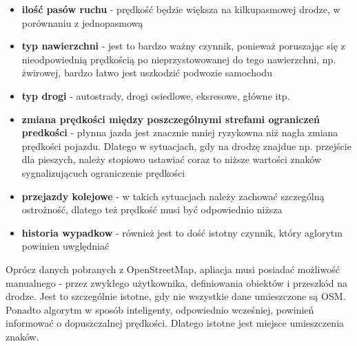 \begin{itemize}
\item \textbf{ilość pasów ruchu} - prędkość będzie większa na kilkupasmowej drodze, w porównaniu z jednopasmową
\item \textbf{typ nawierzchni} - jest to bardzo ważny czynnik, ponieważ poruszając się z nieodpowiednią prędkością po nieprzystowowanej do tego nawierzchni, np. żwirowej, bardzo łatwo jest uszkodzić podwozie samochodu
\item \textbf{typ drogi} - autostrady, drogi osiedlowe, eksresowe, główne itp.
\item \textbf{zmiana prędkości między poszczególnymi strefami ograniczeń predkości} - płynna jazda jest znacznie mniej ryzykowna niż nagła zmiana prędkości pojazdu. Dlatego w sytuacjach, gdy na drodzę znajdue np. przejście dla pieszych, należy stopiowo ustawiać coraz to niższe wartości znaków sygnalizującuch ograniczenie prędkości
\item \textbf{przejazdy kolejowe} - w takich sytuacjach należy zachować szczególną ostrożność, dlatego też prędkość musi być odpowiednio niższa
\item \textbf{historia wypadkow} - również jest to dość istotny czynnik, który aglorytm powinien uwględniać
\end{itemize}

Oprócz danych pobranych z OpenStreetMap, apliacja musi posiadać możliwość manualnego - przez zwykłego użytkownika, definiowania obiektów i przeszkód na drodze. Jest to szczególnie istotne, gdy nie wszystkie dane umieszczone są OSM. Ponadto algorytm w sposób inteligenty, odpowiednio wcześniej, powinień informować o dopuszczalnej prędkości. Dlatego istotne jest miejsce umieszczenia znaków.









